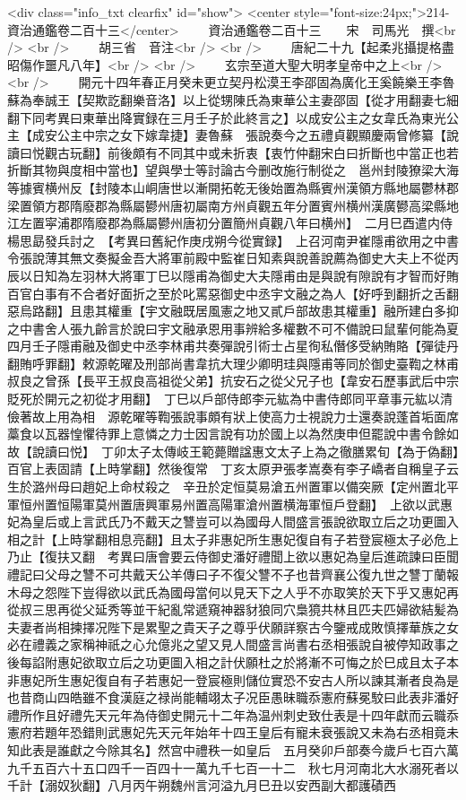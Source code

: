<div class="info_txt clearfix" id="show">
<center style="font-size:24px;">214-資治通鑑卷二百十三</center>
  　　資治通鑑卷二百十三　　宋　司馬光　撰<br />
<br />
　　胡三省　音注<br />
<br />
　　唐紀二十九【起柔兆攝提格盡昭傷作噩凡八年】<br />
<br />
　　玄宗至道大聖大明孝皇帝中之上<br />
<br />
　　開元十四年春正月癸未更立契丹松漠王李邵固為廣化王奚饒樂王李魯蘇為奉誠王【契欺訖翻樂音洛】以上從甥陳氏為東華公主妻邵固【從才用翻妻七細翻下同考異曰東華出降實録在三月壬子於此終言之】以成安公主之女韋氏為東光公主【成安公主中宗之女下嫁韋捷】妻魯蘇　張說奏今之五禮貞觀顯慶兩曾修纂【說讀曰悦觀古玩翻】前後頗有不同其中或未折衷【衷竹仲翻宋白曰折斷也中當正也若折斷其物與度相中當也】望與學士等討論古今删改施行制從之　邕州封陵獠梁大海等據賓横州反【封陵本山峒唐世以漸開拓乾无後始置為縣賓州漢領方縣地屬鬱林郡梁置領方郡隋廢郡為縣屬鬰州唐初屬南方州貞觀五年分置賓州横州漢廣鬰高梁縣地江左置寜浦郡隋廢郡為縣屬鬰州唐初分置簡州貞觀八年曰横州】　二月巳酉遣内侍楊思勗發兵討之　【考異曰舊紀作庚戌朔今從實録】　上召河南尹崔隱甫欲用之中書令張說薄其無文奏擬金吾大將軍前殿中監崔日知素與說善說薦為御史大夫上不從丙辰以日知為左羽林大將軍丁巳以隱甫為御史大夫隱甫由是與說有隙說有才智而好賄百官白事有不合者好面折之至於叱罵惡御史中丞宇文融之為人【好呼到翻折之舌翻惡烏路翻】且患其權重【宇文融既居風憲之地又貳戶部故患其權重】融所建白多抑之中書舍人張九齡言於說曰宇文融承恩用事辨給多權數不可不備說曰鼠輩何能為夏四月壬子隱甫融及御史中丞李林甫共奏彈說引術士占星徇私僭侈受納賄賂【彈徒丹翻賄呼罪翻】敕源乾曜及刑部尚書韋抗大理少卿明珪與隱甫等同於御史臺鞫之林甫叔良之曾孫【長平王叔良高祖從父弟】抗安石之從父兄子也【韋安石歷事武后中宗貶死於開元之初從才用翻】　丁巳以戶部侍郎李元紘為中書侍郎同平章事元紘以清儉著故上用為相　源乾曜等鞫張說事頗有狀上使高力士視說力士還奏說蓬首垢面席藁食以瓦器惶懼待罪上意憐之力士因言說有功於國上以為然庚申但罷說中書令餘如故【說讀曰悦】　丁卯太子太傳岐王範薨贈諡惠文太子上為之徹膳累旬【為于偽翻】百官上表固請【上時掌翻】然後復常　丁亥太原尹張孝嵩奏有李子嶠者自稱皇子云生於潞州母曰趙妃上命杖殺之　辛丑於定恒莫易滄五州置軍以備突厥【定州置北平軍恒州置恒陽軍莫州置唐興軍易州置高陽軍滄州置横海軍恒戶登翻】　上欲以武惠妃為皇后或上言武氏乃不戴天之讐豈可以為國母人間盛言張說欲取立后之功更圖入相之計【上時掌翻相息亮翻】且太子非惠妃所生惠妃復自有子若登宸極太子必危上乃止【復扶又翻　考異曰唐會要云侍御史潘好禮聞上欲以惠妃為皇后進疏諫曰臣聞禮記曰父母之讐不可共戴天公羊傳曰子不復父讐不子也昔齊襄公復九世之讐丁蘭報木母之怨陛下豈得欲以武氏為國母當何以見天下之人乎不亦取笑於天下乎又惠妃再從叔三思再從父延秀等並干紀亂常遞窺神器豺狼同穴梟獍共林且匹夫匹婦欲結髪為夫妻者尚相揀擇况陛下是累聖之貴天子之尊乎伏願詳察古今鑒戒成敗慎擇華族之女必在禮義之家稱神祇之心允億兆之望又見人間盛言尚書右丞相張說自被停知政事之後每諂附惠妃欲取立后之功更圖入相之計伏願杜之於將漸不可悔之於巳成且太子本非惠妃所生惠妃復自有子若惠妃一登宸極則儲位實恐不安古人所以諫其漸者良為是也昔商山四皓雖不食漢庭之禄尚能輔翊太子况臣愚昧職忝憲府蘇冕駮曰此表非潘好禮所作且好禮先天元年為侍御史開元十二年為温州刺史致仕表是十四年獻而云職忝憲府若題年恐錯則武惠妃先天元年始年十四王皇后有寵未衰張說又未為右丞相竟未知此表是誰獻之今除其名】然宫中禮秩一如皇后　五月癸卯戶部奏今歲戶七百六萬九千五百六十五口四千一百四十一萬九千七百一十二　秋七月河南北大水溺死者以千計【溺奴狄翻】八月丙午朔魏州言河溢九月巳丑以安西副大都護磧西